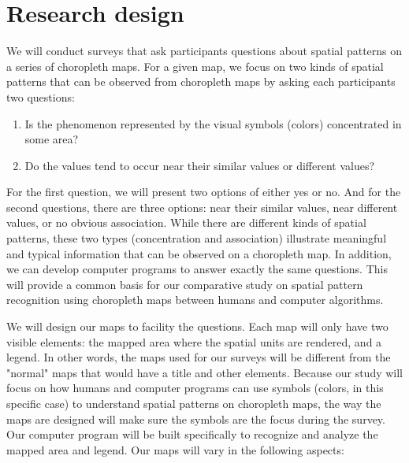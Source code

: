 
\section{Research design}


We will conduct surveys that ask participants questions about spatial patterns on a series of choropleth maps. For a given map, we focus on two kinds of spatial patterns that can be observed from choropleth maps by asking each participants two questions:

\begin{enumerate}
    \item Is the phenomenon represented by the visual symbols (colors) concentrated in some area? 
    \item Do the values tend to occur near their similar values or different values? 
\end{enumerate}

For the first question, we will present two options of either yes or no. And for the second questions, there are three options: near their similar values, near different values, or no obvious association. While there are different kinds of spatial patterns, these two types (concentration and association) illustrate meaningful and typical information that can be observed on a choropleth map. In addition, we can develop computer programs to answer exactly the same questions. This will provide a common basis for our comparative study on spatial pattern recognition using choropleth maps between humans and computer algorithms.

We will design our maps to facility the questions. Each map will only have two visible elements: the mapped area where the spatial units are rendered, and a legend. In other words, the maps used for our surveys will be different from the "normal" maps that would have a title and other elements. Because our study will focus on how humans and computer programs can use symbols (colors, in this specific case) to understand spatial patterns on choropleth maps, the way the maps are designed will make sure the symbols are the focus during the survey. Our computer program will be built specifically to recognize and analyze the mapped area and legend. Our maps will vary in the following aspects:

